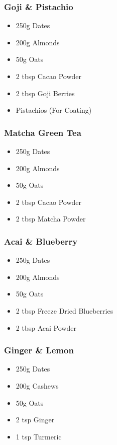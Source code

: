 \documentclass[11pt, english]{article}
\begin{document}
		\subsubsection*{Goji \& Pistachio}

	\begin{itemize}
        \setlength\itemsep{0cm}
                \item 250g Dates
		\item 200g Almonds
		\item 50g Oats
		\item 2 tbsp Cacao Powder
		\item 2 tbsp Goji Berries
		\item Pistachios (For Coating)
        \end{itemize}

		\subsubsection*{Matcha Green Tea}

	\begin{itemize}
        \setlength\itemsep{0cm}
                \item 250g Dates
		\item 200g Almonds
		\item 50g Oats
		\item 2 tbsp Cacao Powder
		\item 2 tbsp Matcha Powder
        \end{itemize}

		\subsubsection*{Acai \& Blueberry}

	\begin{itemize}
        \setlength\itemsep{0cm}
                \item 250g Dates
		\item 200g Almonds
		\item 50g Oats
		\item 2 tbsp Freeze Dried Blueberries
		\item 2 tbsp Acai Powder
        \end{itemize}

		\subsubsection*{Ginger \& Lemon}

	\begin{itemize}
        \setlength\itemsep{0cm}
                \item 250g Dates
		\item 200g Cashews
		\item 50g Oats
		\item 2 tsp Ginger
		\item 1 tsp Turmeric
        \end{itemize}
\end{document}
